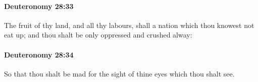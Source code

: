 		\paragraph{Deuteronomy 28:33} %
			\label{DEUTERONOMY-28-33}

			The fruit of thy land, and all thy labours, shall a nation which thou knowest not eat up; and thou shalt be only oppressed and crushed alway:


		\paragraph{Deuteronomy 28:34} %
			\label{DEUTERONOMY-28-34}

			So that thou shalt be mad for the sight of thine eyes which thou shalt see.



